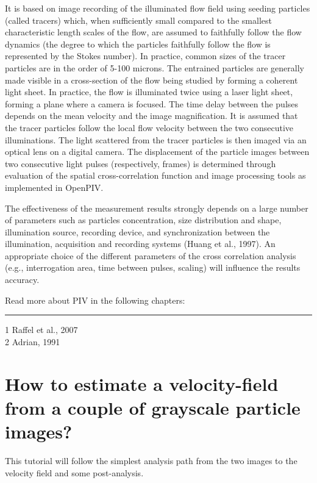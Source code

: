 \documentclass[
  english,
  letterpaper,
  numbers=noendperiod,
  DIV=13]{scrreprt}
\begin{document}
It is based on image recording of the illuminated flow field using
seeding particles (called tracers) which, when sufficiently small
compared to the smallest characteristic length scales of the flow, are
assumed to faithfully follow the flow dynamics (the degree to which the
particles faithfully follow the flow is represented by the Stokes
number). In practice, common sizes of the tracer particles are in the
order of 5-100 microns. The entrained particles are generally made
visible in a cross-section of the flow being studied by forming a
coherent light sheet. In practice, the flow is illuminated twice using a
laser light sheet, forming a plane where a camera is focused. The time
delay between the pulses depends on the mean velocity and the image
magnification. It is assumed that the tracer particles follow the local
flow velocity between the two consecutive illuminations. The light
scattered from the tracer particles is then imaged via an optical lens
on a digital camera. The displacement of the particle images between two
consecutive light pulses (respectively, frames) is determined through
evaluation of the spatial cross-correlation function and image
processing tools as implemented in OpenPIV.

The effectiveness of the measurement results strongly depends on a large
number of parameters such as particles concentration, size distribution
and shape, illumination source, recording device, and synchronization
between the illumination, acquisition and recording systems (Huang et
al., 1997). An appropriate choice of the different parameters of the
cross correlation analysis (e.g., interrogation area, time between
pulses, scaling) will influence the results accuracy.

Read more about PIV in the following chapters:

\begin{center}\rule{0.5\linewidth}{0.5pt}\end{center}

1 Raffel et al., 2007\\
2 Adrian, 1991

\section{How to estimate a velocity-field from a couple of grayscale
particle
images?}\label{how-to-estimate-a-velocity-field-from-a-couple-of-grayscale-particle-images}

This tutorial will follow the simplest analysis path from the two images
to the velocity field and some post-analysis.
\end{document}
